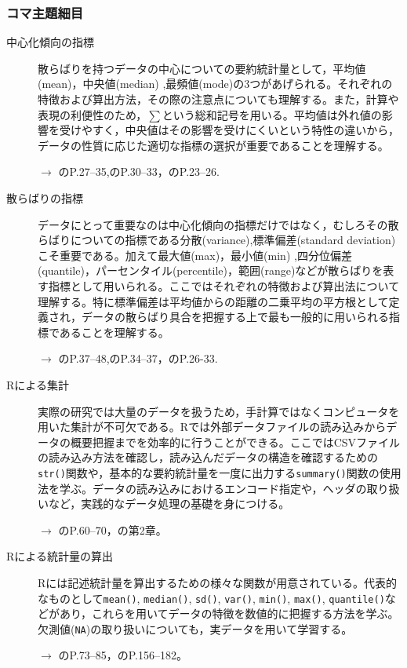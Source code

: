\subsubsection{コマ主題細目}
\begin{description}
	\item[中心化傾向の指標] 散らばりを持つデータの中心についての要約統計量として，平均値(mean)，中央値(median) ,最頻値(mode)の3つがあげられる。それぞれの特徴および算出方法，その際の注意点についても理解する。また，計算や表現の利便性のため，$\sum$という総和記号を用いる。平均値は外れ値の影響を受けやすく，中央値はその影響を受けにくいという特性の違いから，データの性質に応じた適切な指標の選択が重要であることを理解する。
	      \begin{flushright}
		      $\to$ \textcite{Yamauchi201001}のP.27--35,\textcite{Yamada2004}のP.30--33，\textcite{Kawabata201408}のP.23--26.
	      \end{flushright}

	\item[散らばりの指標] データにとって重要なのは中心化傾向の指標だけではなく，むしろその散らばりについての指標である分散(variance),標準偏差(standard deviation)こそ重要である。加えて最大値(max)，最小値(min) ,四分位偏差(quantile)，パーセンタイル(percentile)，範囲(range)などが散らばりを表す指標として用いられる。ここではそれぞれの特徴および算出法について理解する。特に標準偏差は平均値からの距離の二乗平均の平方根として定義され，データの散らばり具合を把握する上で最も一般的に用いられる指標であることを理解する。
	      \begin{flushright}
		      $\to$ \textcite{Yamauchi201001}のP.37--48,\textcite{Yamada2004}のP.34--37，\textcite{Kawabata201408}のP.26-33.
	      \end{flushright}

	\item[Rによる集計] 実際の研究では大量のデータを扱うため，手計算ではなくコンピュータを用いた集計が不可欠である。Rでは外部データファイルの読み込みからデータの概要把握までを効率的に行うことができる。ここではCSVファイルの読み込み方法を確認し，読み込んだデータの構造を確認するための\texttt{str()}関数や，基本的な要約統計量を一度に出力する\texttt{summary()}関数の使用法を学ぶ。データの読み込みにおけるエンコード指定や，ヘッダの取り扱いなど，実践的なデータ処理の基礎を身につける。
	      \begin{flushright}
		      $\to$ \textcite{kosugi2019}のP.60--70，\textcite{Kinosady2021}の第2章。
	      \end{flushright}

	\item[Rによる統計量の算出] Rには記述統計量を算出するための様々な関数が用意されている。代表的なものとして\texttt{mean()}, \texttt{median()}, \texttt{sd()}, \texttt{var()}, \texttt{min()}, \texttt{max()}, \texttt{quantile()}などがあり，これらを用いてデータの特徴を数値的に把握する方法を学ぶ。欠測値(\texttt{NA})の取り扱いについても，実データを用いて学習する。
	      \begin{flushright}
		      $\to$ \textcite{kosugi2019}のP.73--85，\textcite{Baba2020}のP.156--182。
	      \end{flushright}


\end{description}
